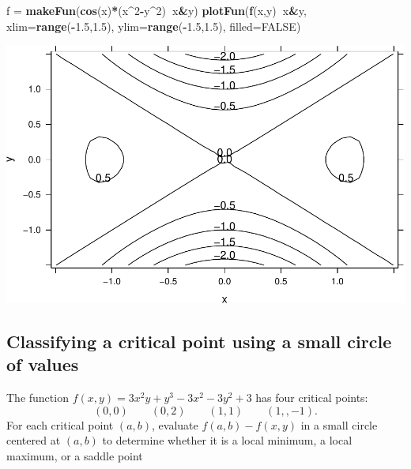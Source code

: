 \documentclass[
]{book}
\newenvironment{Shaded}{\begin{snugshade}}{\end{snugshade}}
\newcommand{\DataTypeTok}[1]{\textcolor[rgb]{0.13,0.29,0.53}{#1}}
\newcommand{\DecValTok}[1]{\textcolor[rgb]{0.00,0.00,0.81}{#1}}
\newcommand{\FloatTok}[1]{\textcolor[rgb]{0.00,0.00,0.81}{#1}}
\newcommand{\KeywordTok}[1]{\textcolor[rgb]{0.13,0.29,0.53}{\textbf{#1}}}
\newcommand{\NormalTok}[1]{#1}
\newcommand{\OperatorTok}[1]{\textcolor[rgb]{0.81,0.36,0.00}{\textbf{#1}}}
\newcommand{\OtherTok}[1]{\textcolor[rgb]{0.56,0.35,0.01}{#1}}
\newcommand{\StringTok}[1]{\textcolor[rgb]{0.31,0.60,0.02}{#1}}
\begin{document}
\begin{Shaded}
\begin{Highlighting}[]
\NormalTok{f =}\StringTok{ }\KeywordTok{makeFun}\NormalTok{(}\KeywordTok{cos}\NormalTok{(x)}\OperatorTok{*}\NormalTok{(x}\OperatorTok{^}\DecValTok{2}\OperatorTok{-}\NormalTok{y}\OperatorTok{^}\DecValTok{2}\NormalTok{)}\OperatorTok{~}\NormalTok{x}\OperatorTok{&}\NormalTok{y)}
\KeywordTok{plotFun}\NormalTok{(}\KeywordTok{f}\NormalTok{(x,y)}\OperatorTok{~}\NormalTok{x}\OperatorTok{&}\NormalTok{y, }\DataTypeTok{xlim=}\KeywordTok{range}\NormalTok{(}\OperatorTok{-}\FloatTok{1.5}\NormalTok{,}\FloatTok{1.5}\NormalTok{), }\DataTypeTok{ylim=}\KeywordTok{range}\NormalTok{(}\OperatorTok{-}\FloatTok{1.5}\NormalTok{,}\FloatTok{1.5}\NormalTok{), }\DataTypeTok{filled=}\OtherTok{FALSE}\NormalTok{)}
\end{Highlighting}
\end{Shaded}

\begin{center}\includegraphics{_bookdown_files/math135_handbook_files/figure-latex/unnamed-chunk-97-1} \end{center}

\hypertarget{classifying-a-critical-point-using-a-small-circle-of-values}{%
\subsection{Classifying a critical point using a small circle of values}\label{classifying-a-critical-point-using-a-small-circle-of-values}}

The function \(f(x,y) =3x^2y + y^3 -3x^2-3y^2+3\) has four critical points:
\[
(0,0) \qquad (0,2) \qquad (1,1) \qquad (1,,-1).
\]
For each critical point \((a,b)\), evaluate \(f(a,b) - f(x,y)\) in a small circle centered at \((a,b)\) to determine whether it is a local minimum, a local maximum, or a saddle point
\end{document}
